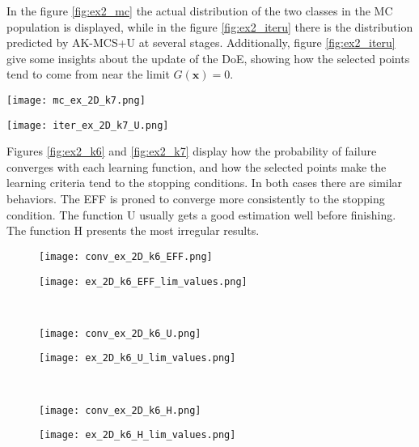 In the figure \ref{fig:ex2_mc} the actual distribution of the two classes in the
MC population is displayed, while in the figure \ref{fig:ex2_iteru} there is the
distribution predicted by AK-MCS+U at several stages. Additionally, figure \ref{fig:ex2_iteru}
give some insights about the update of the DoE, showing how the selected points tend to
come from near the limit $G(\bm{x}) = 0$. \\

\begin{marginfigure}
    \texttt{[image: mc\_ex\_2D\_k7.png]}
    \caption{Example 2 with $k=7$. Evaluation of the performance function on the MC population.}
    \label{fig:ex2_mc}
\end{marginfigure}

\begin{figure*}[h!]
    \texttt{[image: iter\_ex\_2D\_k7\_U.png]}
    \caption{Example 2 with $k=7$. Prediction made by AK-MCS+U at several stages.}
    \label{fig:ex2_iteru}
\end{figure*}

Figures  \ref{fig:ex2_k6} and \ref{fig:ex2_k7} display how the probability of failure
converges with each learning function, and how the selected points make the learning criteria
tend to the stopping conditions. In both cases there are similar behaviors. The 
EFF is proned to converge more consistently to the stopping condition. The function 
U usually gets a good estimation well before finishing. The function H
presents the most irregular results. 

\begin{figure*}[h]
    \begin{subfigure}{.5\textwidth}
        \centering
        \texttt{[image: conv\_ex\_2D\_k6\_EFF.png]}
      \end{subfigure}%
      \begin{subfigure}{.5\textwidth}
        \centering
        \texttt{[image: ex\_2D\_k6\_EFF\_lim\_values.png]}
      \end{subfigure}%
      \\
      \begin{subfigure}{.5\textwidth}
        \centering
        \texttt{[image: conv\_ex\_2D\_k6\_U.png]}
      \end{subfigure}%
      \begin{subfigure}{.5\textwidth}
        \centering
        \texttt{[image: ex\_2D\_k6\_U\_lim\_values.png]}
      \end{subfigure}%
      \\    \begin{subfigure}{.5\textwidth}
        \centering
        \texttt{[image: conv\_ex\_2D\_k6\_H.png]}
      \end{subfigure}%
      \begin{subfigure}{.5\textwidth}
        \centering
        \texttt{[image: ex\_2D\_k6\_H\_lim\_values.png]}
      \end{subfigure}%
      \caption{Results of example 2 with $k=6$}
      \label{fig:ex2_k6}
\end{figure*}

